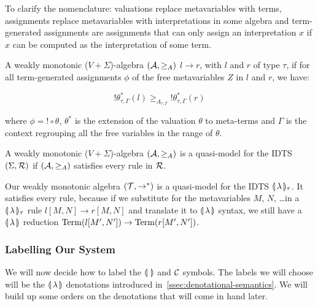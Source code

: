 To clarify the nomenclature: valuations replace metavariables with terms,
assignments replace metavariables with interpretations in some algebra and
term-generated assignments are assignments that can only assign an
interpretation $x$ if $x$ can be computed as the interpretation of some
term.

\begin{definition}
  A weakly monotonic ($V+\Sigma$)-algebra $(\mathcal{A}, \ge_A)$  $l \to r$, with $l$ and $r$ of type $\tau$, if
  for all term-generated assignments $\phi$ of the free metavariables $Z$
  in $l$ and $r$, we have:

  $$
  ! \theta^*_{\tau,\Gamma}(l) \ge_{A_{\tau,\Gamma}} ! \theta^*_{\tau,\Gamma}(r)
  $$

  where $\phi = ! \circ \theta$, $\theta^*$ is the extension of the
  valuation $\theta$ to meta-terms and $\Gamma$ is the context regrouping
  all the free variables in the range of $\theta$.
\end{definition}

\begin{definition}
  A weakly monotonic ($V+\Sigma$)-algebra $(\mathcal{A}, \ge_A)$ is a quasi-model
  for the IDTS $(\Sigma, \mathcal{R})$ if $(\mathcal{A}, \ge_A)$ satisfies every rule in
  $\mathcal{R}$.
\end{definition}

Our weakly monotonic algebra $(\mathcal{T}, \to^*)$ is a quasi-model for the IDTS
$\llparenthesis \, \lambda \, \rrparenthesis_\tau$. It satisfies every rule, because if we substitute
for the metavariables $M$, $N$, \ldots in a $\llparenthesis \, \lambda \, \rrparenthesis_\tau$ rule
$l[M,N] \to r[M,N]$ and translate it to $\llparenthesis \, \lambda \, \rrparenthesis$ syntax, we still
have a $\llparenthesis \, \lambda \, \rrparenthesis$ reduction $\operatorname{Term}(l[M',N']) \to \operatorname{Term}(r[M',N'])$.


\subsubsection{Labelling Our System}

We will now decide how to label the $\llparenthesis \,  \, \rrparenthesis$ and $\mathcal{C}$ symbols. The
labels we will choose will be the $\llparenthesis \, \lambda \, \rrparenthesis$ denotations introduced
in~\ref{ssec:denotational-semantics}. We will build up some orders on the
denotations that will come in hand later.


